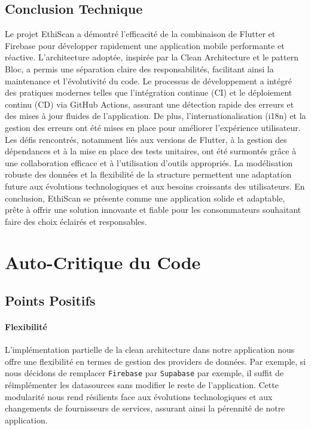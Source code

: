\subsection{Conclusion Technique}

Le projet EthiScan a démontré l'efficacité de la combinaison de Flutter et Firebase pour développer rapidement une application mobile performante et réactive. L'architecture adoptée, inspirée par la Clean Architecture et le pattern Bloc, a permis une séparation claire des responsabilités, facilitant ainsi la maintenance et l'évolutivité du code.
Le processus de développement a intégré des pratiques modernes telles que l'intégration continue (CI) et le déploiement continu (CD) via GitHub Actions, assurant une détection rapide des erreurs et des mises à jour fluides de l'application. De plus, l'internationalisation (i18n) et la gestion des erreurs ont été mises en place pour améliorer l'expérience utilisateur. Les défis rencontrés, notamment liés aux versions de Flutter, à la gestion des dépendances et à la mise en place des tests unitaires, ont été surmontés grâce à une collaboration efficace et à l'utilisation d'outils appropriés. La modélisation robuste des données et la flexibilité de la structure permettent une adaptation future aux évolutions technologiques et aux besoins croissants des utilisateurs. En conclusion, EthiScan se présente comme une application solide et adaptable, prête à offrir une solution innovante et fiable pour les consommateurs souhaitant faire des choix éclairés et responsables.

\section{Auto-Critique du Code}

\subsection{Points Positifs}

\paragraph{Flexibilité}
L'implémentation partielle de la clean architecture dans notre application nous offre une flexibilité en termes de gestion des providers de données. Par exemple, si nous décidons de remplacer \texttt{Firebase} par \texttt{Supabase} par exemple, il suffit de réimplémenter les datasources sans modifier le reste de l'application. Cette modularité nous rend résilients face aux évolutions technologiques et aux changements de fournisseurs de services, assurant ainsi la pérennité de notre application.


